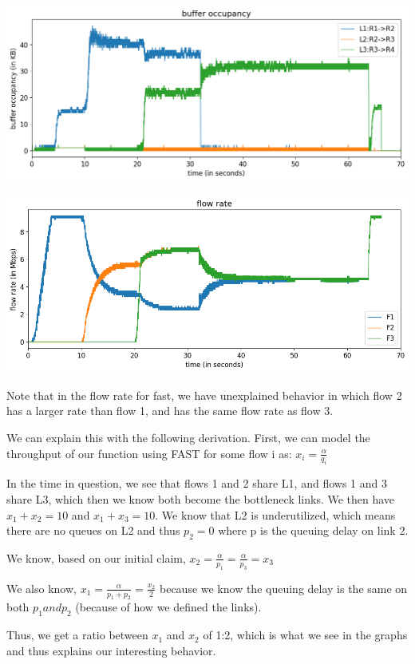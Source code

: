 \documentclass{article}
\begin{document}
\includegraphics[width = \textwidth]{"test_case2_fast buffer occupancy"}


\includegraphics[width = \textwidth]{"test_case2_fast flow rate"}

Note that in the flow rate for fast, we have unexplained behavior in which flow 2 has a larger rate than flow 1, and has the same flow rate as flow 3. 

We can explain this with the following derivation. First, we can model the throughput of our function using FAST for some flow i as: $ x_i = \frac{\alpha}{q_i} $

In the time in question, we see that flows 1 and 2 share L1, and flows 1 and 3 share L3, which then we know both become the bottleneck links. We then have $x_1 + x_2 = 10 $ and $x_1 + x_3 = 10 $. We know that L2 is underutilized, which means there are no queues on L2 and thus $p_2 = 0 $ where p is the queuing delay on link 2.

We know, based on our initial claim, $ x_2 = \frac{\alpha}{p_1} = \frac{\alpha}{p_3}  = x_3$

We also know, $x_1 = \frac{\alpha}{p_1 + p_2} = \frac{x_2}{ 2}$ because we know the queuing delay is the same on both $p_1 and p_2$ (because of how we defined the links).

Thus, we get a ratio between $x_1$ and $x_2$ of 1:2, which is what we see in the graphs and thus explains our interesting behavior.
\end{document}
